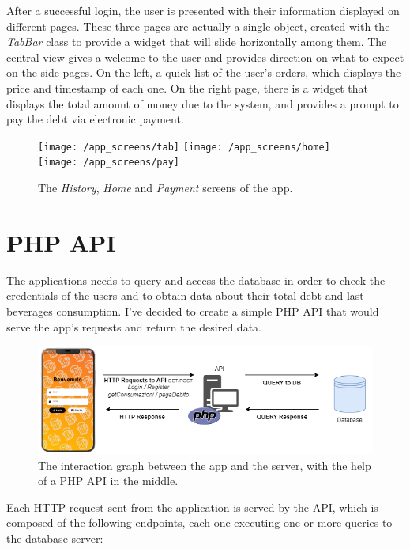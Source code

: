 \documentclass[target=bach,aauheader=,style=]{thud}
\begin{document}
After a successful login, the user is presented with their information displayed on different pages. These three pages are actually a single object, created with the \emph{TabBar} class to provide a widget that will slide horizontally among them. The central view gives a welcome to the user and provides direction on what to expect on the side pages. On the left, a quick list of the user's orders, which displays the price and timestamp of each one. On the right page, there is a widget that displays the total amount of money due to the system, and provides a prompt to pay the debt via electronic payment.


\begin{figure}[h!]

		\centering
		\texttt{[image: /app\_screens/tab]} %
		\space\space\space
		\texttt{[image: /app\_screens/home]} %
		\space\space\space
		\texttt{[image: /app\_screens/pay]} %
		\caption{The \emph{History}, \emph{Home} and \emph{Payment} screens of the app.}
		\label{fig:app2}

\end{figure}

\section{PHP API}
The applications needs to query and access the database in order to check the credentials of the users and to obtain data about their total debt and last beverages consumption.
I've decided to create a simple PHP API that would serve the app's requests and return the desired data.
\begin{figure}[htp]
	\centering
	\includegraphics[scale=0.69]{app_diagram} %
	\caption{The interaction graph between the app and the server, with the help of a PHP API in the middle.}
	\label{fig:app_diagram}
\end{figure}

Each HTTP request sent from the application is served by the API, which is composed of the following endpoints, each one executing one or more queries to the database server:
\end{document}
